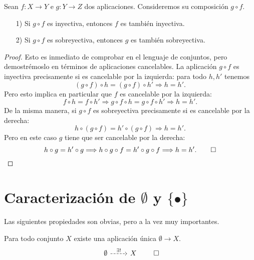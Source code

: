 \begin{observacion}
  \label{obs:composiciones-son-mono-epi}
  Sean $f\colon X\to Y$ e $g\colon Y\to Z$ dos aplicaciones. Consideremos su
  composición $g\circ f$.

  \begin{enumerate}
  \item[1)] Si $g\circ f$ es inyectiva, entonces $f$ es también inyectiva.

  \item[2)] Si $g\circ f$ es sobreyectiva, entonces $g$ es también sobreyectiva.
  \end{enumerate}

  \begin{proof}
    Esto es inmediato de comprobar en el lenguaje de conjuntos, pero
    demostrémoslo en términos de aplicaciones cancelables. La aplicación
    $g\circ f$ es inyectiva precisamente si es cancelable por la izquierda: para
    todo $h,h'$ tenemos
    $$(g\circ f)\circ h = (g\circ f)\circ h' \Longrightarrow h = h'.$$
    Pero esto implica en particular que $f$ es cancelable por la izquierda:
    \[ f\circ h = f\circ h' \Longrightarrow
      g\circ f\circ h = g\circ f\circ h' \Longrightarrow h = h'. \]
    De la misma manera, si $g\circ f$ es sobreyectiva precisamente si es
    cancelable por la derecha:
    $$h\circ (g\circ f) = h'\circ (g\circ f) \Longrightarrow h = h'.$$
    Pero en este caso $g$ tiene que ser cancelable por la derecha:
    \[ h\circ g = h'\circ g \Longrightarrow
      h\circ g\circ f = h'\circ g\circ f \Longrightarrow h = h'. \qedhere \]
  \end{proof}
\end{observacion}


\section{Caracterización de\texorpdfstring{ $\emptyset$}{l conjunto vacío} y \texorpdfstring{$\{ \bullet \}$}{\{ * \}}}

Las siguientes propiedades son obvias, pero a la vez muy importantes.

\begin{observacionejerc}
  \label{obs:propiedad-universal-de-emptyset}
  Para todo conjunto $X$ existe una aplicación única $\emptyset \to X$.
  \[ \begin{tikzcd}
      \emptyset \ar[dashed]{r}{\exists !} & X
    \end{tikzcd} \qedhere \]
\end{observacionejerc}

